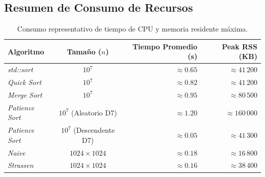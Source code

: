 \subsection{Resumen de Consumo de Recursos}

\begin{table}[H]
\centering
\small
\begin{tabular}{|l|c|r|r|}
\hline
\textbf{Algoritmo} & \textbf{Tamaño ($n$)} & \textbf{Tiempo Promedio (s)} & \textbf{Peak RSS (KB)} \\ \hline
\textit{std::sort}       & $10^7$ & $\approx 0.65$ & $\approx 41\,200$ \\ \hline
\textit{Quick Sort}      & $10^7$ & $\approx 0.82$ & $\approx 41\,200$ \\ \hline
\textit{Merge Sort}      & $10^7$ & $\approx 0.95$ & $\approx 80\,500$ \\ \hline
\textit{Patience Sort}   & $10^7$ (Aleatorio D7) & $\approx 1.20$ & $\approx 160\,000$ \\ \hline
\textit{Patience Sort}   & $10^7$ (Descendente D7) & $\approx 0.05$ & $\approx 41\,300$ \\ \hline
\textit{Naive}           & $1024 \times 1024$ & $\approx 0.18$ & $\approx 16\,800$ \\ \hline
\textit{Strassen}        & $1024 \times 1024$ & $\approx 0.16$ & $\approx 38\,400$ \\ \hline
\end{tabular}
\caption{Consumo representativo de tiempo de CPU y memoria residente máxima.}
\label{tab:app_recursos}
\end{table}